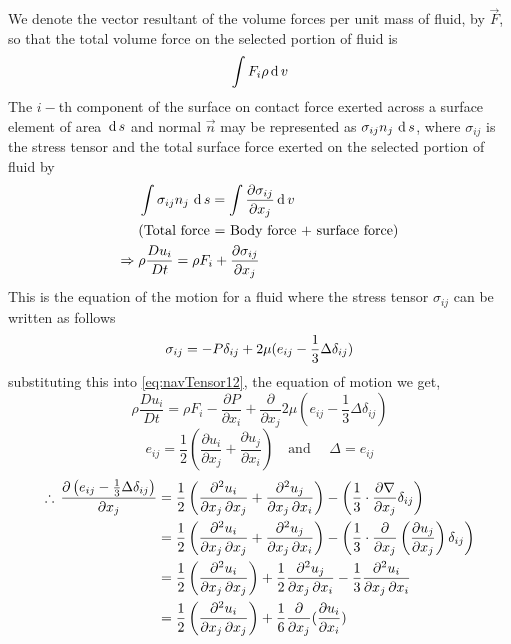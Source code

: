 \documentclass[../main-sheet.tex]{subfiles}
\begin{document}
\begin{soln}
    We denote the vector resultant of the volume forces per unit mass of fluid, by \(\vec{F}\), so that the total volume force on the selected portion of fluid is
    \[\int F_i \rho \,\mathrm{d}\, v\]
    The \(i-\)th component of the surface on contact force exerted across a surface element of area \(\,\mathrm{d}\, s\) and normal \(\vec{n} \) may be represented as \(\sigma_{ij}n_j\,\,\mathrm{d}\, s\), where \(\sigma_{ij}\) is the stress tensor and the total surface force exerted on the selected portion of fluid by
    \begin{align}
        & \int \sigma_{ij}n_j\,\,\mathrm{d}\, s=\int \frac{\partial \sigma_{ij}}{\partial x_j}\,\mathrm{d}\, v\notag\\
        & (\text{Total force = Body force + surface force})\notag\\
       \Rightarrow\; & \rho \frac{D u_i}{D t}=\rho F_i+\frac{\partial \sigma_{ij}}{\partial x_j}\label{eq:navTensor12}
    \end{align}
    This is the equation of the motion for a fluid where the stress tensor \(\sigma_{ij}\) can be written as follows
    \[\sigma_{ij} =-P\delta_{ij}+2\mu (e_{ij}-\frac{1}{3}\Delta \delta_{ij})\]
    substituting this into \eqref{eq:navTensor12}, the equation of motion we get,
    \[\rho \frac{D u_i}{D t}=\rho F_i-\frac{\partial P}{\partial x_i}+\frac{\partial}{\partial x_j}{2\mu(e_{ij}-\frac{1}{3}\Delta \delta_{ij})}\]
    \[e_{ij}=\frac{1}{2}\left( \frac{\partial u_i}{\partial x_j}+\frac{\partial u_j}{\partial x_i} \right)\quad \text{and  } \quad \Delta =e_{ij}\]
    \begin{align*}
        \therefore\,\frac{\partial \left( e_{ij}-\frac{1}{3}\Delta \dij \right)}{\partial x_j}&=\frac{1}{2}\left( \frac{\partial^2 u_i}{\partial x_j\,\partial x_j}+\frac{\partial^2 u_j}{\partial x_j\,\partial x_i} \right)-\left( \frac{1}{3}\cdot\frac{\partial \nabla}{\partial x_j}\dij \right)\\
        &=\frac{1}{2}\left( \frac{\partial^2 u_i}{\partial x_j\,\partial x_j}+\frac{\partial^2 u_j}{\partial x_j\,\partial x_i} \right)-\left( \frac{1}{3}\cdot\frac{\partial }{\partial x_j}\left( \frac{\partial u_j}{\partial x_j} \right)\dij \right)\\
        &=\frac{1}{2}\left( \frac{\partial^2 u_i}{\partial x_j\,\partial x_j} \right)+\frac{1}{2}\frac{\partial^2 u_j}{\partial x_j\,\partial x_i}-\frac{1}{3}\frac{\partial^2 u_i}{\partial x_j\,\partial x_i}\\
        &=\frac{1}{2}\left( \frac{\partial^2 u_i}{\partial x_j\,\partial x_j} \right)+\frac{1}{6}\frac{\partial}{\partial x_j}(\frac{\partial u_i}{\partial x_i})\\

\end{align*}
\end{soln}
\end{document}

